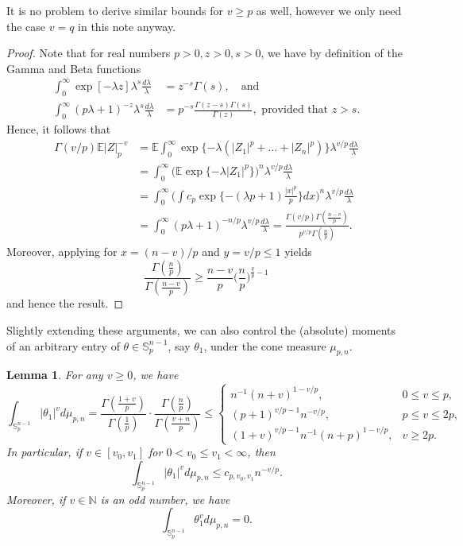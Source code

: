 \documentclass[a4paper,12pt]{amsart}
\numberwithin{equation}{section}
\newtheorem{lemma}[satz]{Lemma}
\theoremstyle{remark}
\def\E{{\mathbb E}}
\def\N{{\mathbb N}}
\def\S{{\mathbb S}}
\begin{document}
It is no problem to derive similar bounds for $v \ge p$ as well, however we only need the case $v=q$ in this note anyway.

\begin{proof}
Note that for real numbers $p >0, z>0, s>0$, we have by definition of the Gamma and Beta functions 
\begin{align}
\int_0^{\infty} \exp[-\lambda z ] \lambda^{s}  \frac{d\lambda} {\lambda} &= z^{-s} \Gamma(s), \label{gamma}\quad \text{and}\\
\int_0^{\infty}   (p \lambda +  1)^{-z} \lambda^{s}\frac {d\lambda}{\lambda} &= p^{-s}\frac{\Gamma(z-s) \Gamma(s)}{\Gamma(z)}, \label{beta} \text{ provided that }  z > s.
\end{align}
    Hence, it follows that
\begin{align*}
 \Gamma(v/p) \E  \lvert Z\rvert_p^{-v} &= \E \int_0^{\infty} \exp\{-\lambda (|Z_1|^p + \ldots + |Z_n|^p)\} \lambda^{v/p}\frac {d\lambda} {\lambda}\\
 &=  \int_0^{\infty} \Big(\E \exp\{-\lambda |Z_1|^p\} \Big)^n  \lambda^{v/p}\frac {d\lambda}{\lambda}\\
&=  \int_0^{\infty}  \Big(\int c_p\exp\{-(\lambda p +1)\frac{|x|^p} {p} \} dx \Big)^n \lambda^{v/p} \frac {d\lambda}{\lambda}\\
&= \int_0^{\infty}   (p \lambda +  1)^{-n/p} \lambda^{v/p}\frac {d\lambda}{\lambda} = \frac {\Gamma(v/p) \Gamma(\frac{n-v}{p})}{p^{v/p} \Gamma(\frac n p)}.
\end{align*}
Moreover, applying \cite[Th.\ 2]{Jam13} for $x= (n-v)/p$ and $y = v/p \le 1$ yields
\[
\frac{\Gamma(\frac{n}{p})}{\Gamma(\frac{n-v}{p})} \ge \frac{n-v}{p} \Big(\frac{n}{p}\Big)^{\frac{q}{p}-1}
\]
and hence the result.
\end{proof}

Slightly extending these arguments, we can also control the (absolute) moments of an arbitrary entry of $\theta \in \S_p^{n-1}$, say $\theta_1$, under the cone measure $\mu_{p,n}$.

\begin{lemma}\label{Momente}
	For any $v \ge 0$, we have
	\[
	\int_{\S_p^{n-1}} |\theta_1|^v d\mu_{p,n} = \frac{ \Gamma(\frac{1 + v}{p})} {\Gamma(\frac 1 p)} \cdot \frac{\Gamma(\frac{n} {p})} {\Gamma(\frac{v+n}{p})}
 \le \begin{cases}
     n^{-1}(n+v)^{1-v/p}, & 0\le v \le p,\\
     (p+1)^{v/p-1}n^{-v/p}, & p \le v \le 2p,\\
     (1+v)^{v/p-1} n^{-1}(n+p)^{1-v/p}, & v \ge 2p.
 \end{cases}
	\]
 In particular, if $v \in [v_0, v_1]$ for $0 < v_0 \le v_1 < \infty$, then
 \[
 \int_{\S_p^{n-1}} |\theta_1|^v d\mu_{p,n} \le c_{p,v_0,v_1} n^{-v/p}.
 \]
	Moreover, if $v \in \N$ is an odd number, we have
 \[
 \int_{\S_p^{n-1}} \theta_1^v d\mu_{p,n} = 0.
 \]
\end{lemma}
\end{document}
